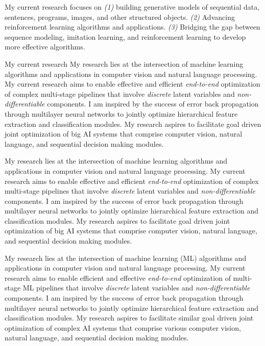 \documentclass[a4paper, 10pt]{article}
\newcommand{\figref}[1]{Figure~\ref{#1}}
\begin{document}
My
current research focuses on {\em (1)} building generative models of
sequential data, sentences, programs, images, and other structured
objects.  {\em (2)} Advancing reinforcement learning algorithms and
applications. {\em (3)} Bridging the gap between sequence modeling,
imitation learning, and reinforcement learning to develop more
effective algorithms.


My current
research My research lies at the intersection of machine learning algorithms
and applications in computer vision and natural language processing.
My current research aims to enable effective and efficient {\em                                                                                            
  end-to-end} optimization of complex multi-stage pipelines that
involve {\em discrete} latent variables and {\em non-differentiable}
components.  I am inspired by the success of error back propagation
through multilayer neural networks to jointly optimize hierarchical
feature extraction and classification modules. My research aspires
to facilitate goal driven joint optimization of big AI systems that
comprise computer vision, natural language, and sequential decision
making modules.



My research lies at the intersection of machine learning algorithms
and applications in computer vision and natural language processing.
My current research aims to enable effective and efficient {\em                                                                                            
  end-to-end} optimization of complex multi-stage pipelines that
involve {\em discrete} latent variables and {\em non-differentiable}
components.  I am inspired by the success of error back propagation
through multilayer neural networks to jointly optimize hierarchical
feature extraction and classification modules. My research aspires
to facilitate goal driven joint optimization of big AI systems that
comprise computer vision, natural language, and sequential decision
making modules.

My research lies at the intersection of machine learning (ML)
algorithms and applications in computer vision and natural language
processing.  My current research aims to enable efficient and
effective {\em end-to-end} optimization of multi-stage ML pipelines
that involve {\em discrete} latent variables and {\em
  non-differentiable} components.  I am inspired by the success of
error back propagation through multilayer neural networks to jointly
optimize hierarchical feature extraction and classification modules.
My research aspires to facilitate similar
goal driven joint optimization of complex AI systems that comprise
various computer vision, natural language, and sequential decision
making modules.
\end{document}
